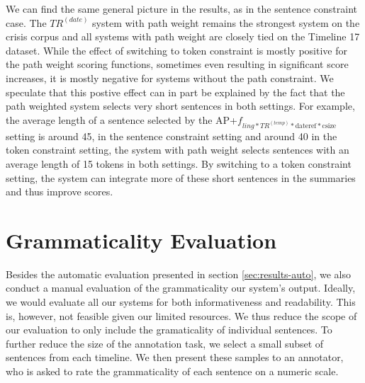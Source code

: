 \documentclass[a4paper,BCOR=10mm]{report}
\numberwithin{lemma}{chapter}
\numberwithin{definition}{chapter}
\begin{document}
We can find the same general picture in the results, as in the sentence constraint case. The $TR^{(date)}$ system with path weight remains the strongest system on the crisis corpus and all systems with path weight are closely tied on the Timeline 17 dataset.
While the effect of switching to token constraint is mostly positive for the path weight scoring functions, sometimes even resulting in significant score increases, it is mostly negative for systems without the path constraint. We speculate that this postive effect can in part be explained by the fact that the path weighted system selects very short sentences in both settings.
For example, the average length of a sentence selected by the AP+$f_{ling*TR^{(temp)}*\text{dateref}*\text{csize}}$ setting is around 45, in the sentence constraint setting and around 40 in the token constraint setting, the system with path weight selects sentences with an average length of 15 tokens in both settings.
By switching to a token constraint setting, the system can integrate more of these short sentences in the summaries and thus improve scores.


%

\chapter{Grammaticality Evaluation} \label{sec:results-manual}

Besides the automatic evaluation presented in section \ref{sec:results-auto}, we also conduct a manual evaluation of the grammaticality our system's output.
Ideally, we would evaluate all our systems for both informativeness and readability. This is, however, not feasible given our limited resources.
We thus reduce the scope of our evaluation to only include the gramaticality of individual sentences.
To further reduce the size of the annotation task, we select a small subset of sentences from each timeline.
We then present these samples to an annotator, who is asked to rate the grammaticality of each sentence on a numeric scale.
\end{document}
